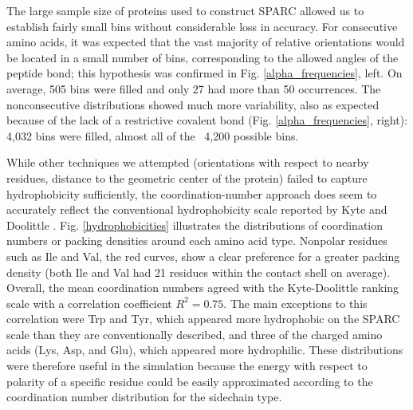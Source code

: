 \documentclass[11pt,titlepage]{article}
\begin{document}
The large sample size of proteins used to construct SPARC allowed us to establish fairly small bins without considerable loss in accuracy.
For consecutive amino acids, it was expected that the vast majority of relative orientations would be located in a small number of bins, corresponding to the allowed angles of the peptide bond; this hypothesis was confirmed in Fig. \ref{alpha_frequencies}, left.
On average, 505 bins were filled and only 27 had more than 50 occurrences.
The nonconsecutive distributions showed much more variability, also as expected because of the lack of a restrictive covalent bond (Fig. \ref{alpha_frequencies}, right): 4,032 bins were filled, almost all of the ~4,200 possible bins.

While other techniques we attempted (orientations with respect to nearby residues, distance to the geometric center of the protein) failed to capture hydrophobicity sufficiently, the coordination-number approach does seem to accurately reflect the conventional hydrophobicity scale reported by Kyte and Doolittle \cite{kyte}.
Fig. \ref{hydrophobicities} illustrates the distributions of coordination numbers or packing densities around each amino acid type.
Nonpolar residues such as Ile and Val, the red curves, show a clear preference for a greater packing density (both Ile and Val had 21 residues within the contact shell on average).
Overall, the mean coordination numbers agreed with the Kyte-Doolittle ranking scale with a correlation coefficient $R^2=0.75$. 
The main exceptions to this correlation were Trp and Tyr, which appeared more hydrophobic on the SPARC scale than they are conventionally described, and three of the charged amino acids (Lys, Asp, and Glu), which appeared more hydrophilic.
These distributions were therefore useful in the simulation because the energy with respect to polarity of a specific residue could be easily approximated according to the coordination number distribution for the sidechain type.
\end{document}

